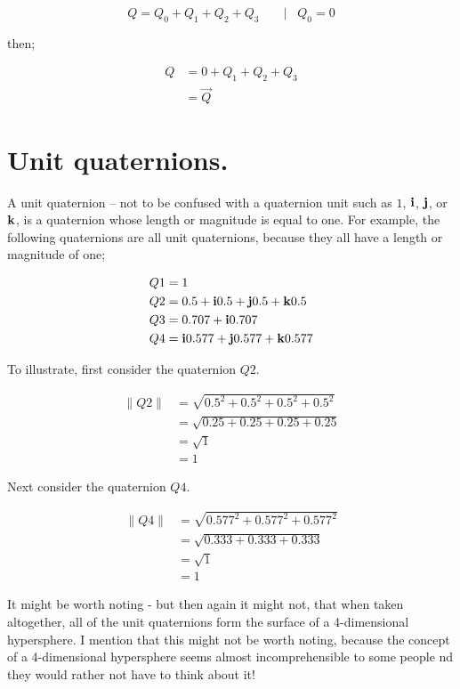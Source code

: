 \begin{equation*}
    Q = Q_0 + Q_1 + Q_2 + Q_3 \; \; \; \; \; \; \mid \; \; Q_0 = 0
\end{equation*}
\vspace{0.0\baselineskip}

then;

\begin{align*}
    Q & = 0 + Q_1 + Q_2 + Q_3  \\
      & = \vec{Q}
\end{align*}
\vspace{0.0\baselineskip}


\section{Unit quaternions.}

A unit quaternion -- not to be confused with a quaternion unit such as \(1\), \(\bm{\mathrm{i}}\), \(\bm{\mathrm{j}}\), or \(\bm{\mathrm{k}}\), is a
quaternion whose length or magnitude is equal to one. For example, the following quaternions are all unit quaternions,
because they all have a length or magnitude of one;

\begin{align*}
    Q1 & = 1  \\
    Q2 & = 0.5 + \bm{\mathrm{i}} 0.5 + \bm{\mathrm{j}} 0.5 + \bm{\mathrm{k}}0.5  \\
    Q3 & = 0.707 + \bm{\mathrm{i}} 0.707  \\
    Q4 & = \bm{\mathrm{i}} 0.577 + \bm{\mathrm{j}} 0.577 + \bm{\mathrm{k}}0.577
\end{align*}
\vspace{0.0\baselineskip}

To illustrate, first consider the quaternion \(Q2\).

\begin{align*}
    \lVert Q2 \rVert & = \sqrt{0.5^2 + 0.5^2 + 0.5^2 + 0.5^2}  \\
                     & = \sqrt{0.25 + 0.25 + 0.25 + 0.25}  \\
                     & = \sqrt{1}  \\
                     & = 1
\end{align*}
\vspace{0.0\baselineskip}

Next consider the quaternion \(Q4\).

\begin{align*}
    \lVert Q4 \rVert & = \sqrt{0.577^2 + 0.577^2 + 0.577^2}  \\
                     & = \sqrt{0.333 + 0.333 + 0.333}  \\
                     & = \sqrt{1}  \\
                     & = 1
\end{align*}
\vspace{0.0\baselineskip}

It might be worth noting - but then again it might not, that when taken altogether, all of the unit quaternions form the
surface of a 4-dimensional hypersphere. I mention that this might not be worth noting, because the concept of a
4-dimensional hypersphere seems almost incomprehensible to some people nd they would rather not have to think about it!
